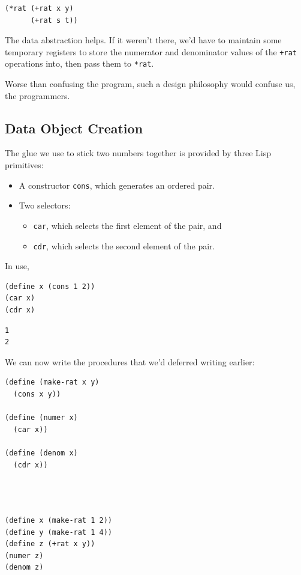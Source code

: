 \documentclass[9pt]{report}
\begin{document}
\begin{verbatim}
(*rat (+rat x y)
      (+rat s t))
\end{verbatim}

The data abstraction helps. If it weren't there, we'd have to
maintain some temporary registers to store the numerator and
denominator values of the \texttt{+rat} operations into, then pass them to
\texttt{*rat}.

Worse than confusing the program, such a design philosophy would
confuse us, the programmers.

\subsection{Data Object Creation}
\label{sec:org596db44}

The glue we use to stick two numbers together is provided by three
Lisp primitives:
\begin{itemize}
\item A constructor \texttt{cons}, which generates an ordered pair.
\item Two selectors:
\begin{itemize}
\item \texttt{car}, which selects the first element of the pair, and
\item \texttt{cdr}, which selects the second element of the pair.
\end{itemize}
\end{itemize}

In use,
\begin{verbatim}
(define x (cons 1 2))
(car x)
(cdr x)
\end{verbatim}

\begin{verbatim}
1
2
\end{verbatim}


We can now write the procedures that we'd deferred writing
earlier:

\begin{verbatim}
(define (make-rat x y)
  (cons x y))

(define (numer x)
  (car x))

(define (denom x)
  (cdr x))
\end{verbatim}

\begin{verbatim}



(define x (make-rat 1 2))
(define y (make-rat 1 4))
(define z (+rat x y))
(numer z)
(denom z)
\end{verbatim}
\end{document}
